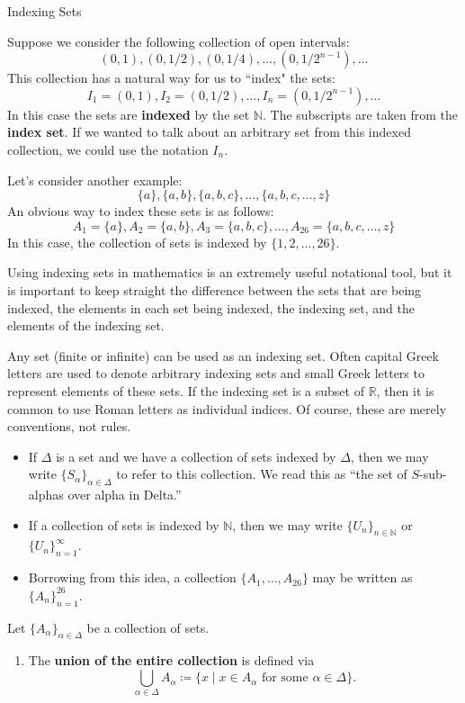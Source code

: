 \begin{section}{Indexing Sets}

Suppose we consider the following collection of open intervals:
\[
(0,1), (0,1/2), (0,1/4), \ldots, (0,1/2^{n-1}), \ldots
\]
This collection has a natural way for us to ``index" the sets:
\[
I_1=(0,1), I_2=(0,1/2), \ldots, I_n=(0,1/2^{n-1}), \ldots
\]
In this case the sets are \textbf{indexed} by the set $\mathbb{N}$.  The subscripts are taken from the \textbf{index set}.  If we wanted to talk about an arbitrary set from this indexed collection, we could use the notation $I_n$.

Let's consider another example:
\[
\{a\}, \{a,b\}, \{a,b,c\}, \ldots, \{a,b,c,\ldots,z\}
\]
An obvious way to index these sets is as follows:
\[
A_1=\{a\}, A_2=\{a,b\}, A_3=\{a,b,c\}, \ldots, A_{26}=\{a,b,c,\ldots,z\}
\]
In this case, the collection of sets is indexed by $\{1,2,\ldots, 26\}$.

Using indexing sets in mathematics is an extremely useful notational tool, but it is important to keep straight the difference between the sets that are being indexed, the elements in each set being indexed, the indexing set, and the elements of the indexing set.

Any set (finite or infinite) can be used as an indexing set. Often capital Greek letters are used to denote arbitrary indexing sets and small Greek letters to represent elements of these sets. If the indexing set is a subset of $\mathbb{R}$, then it is common to use Roman letters as individual indices. Of course, these are merely conventions, not rules.
\begin{itemize}
\item If $\Delta$ is a set and we have a collection of sets indexed by $\Delta$, then we may write $\{S_{\alpha}\}_{\alpha\in \Delta}$ to refer to this collection. We read this as ``the set of $S$-sub-alphas over alpha in Delta.''
\item If a collection of sets is indexed by $\mathbb{N}$, then we may write $\{U_n\}_{n\in\mathbb{N}}$ or $\{U_n\}_{n=1}^{\infty}$.
\item Borrowing from this idea, a collection $\{A_1,\ldots,A_{26}\}$ may be written as $\{A_n\}_{n=1}^{26}$.
\end{itemize}

\begin{definition}
Let $\{A_{\alpha}\}_{\alpha\in\Delta}$ be a collection of sets.
\begin{enumerate}[label=\textrm{(\alph*)}]
\item The \textbf{union of the entire collection} is defined via
\[
\boxed{\bigcup_{\alpha\in\Delta} A_{\alpha}\coloneqq \{x\mid x\in A_{\alpha} \mbox{ for some }\alpha\in \Delta\}}.
\]


\end{enumerate}
\end{definition}
\end{section}
